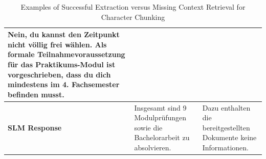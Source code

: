 \documentclass[12pt]{article} %
\begin{document}
\begin{table}[htbp]
\begin{tabularx}{\textwidth}{l X X}
        Nein, du kannst den Zeitpunkt nicht v\"ollig frei w\"ahlen. Als formale Teilnahmevoraussetzung f\"ur das Praktikums-Modul ist vorgeschrieben, dass du dich mindestens im 4. Fachsemester befinden musst.                                                                                                                                                                                                                                                                                                                                                                                                                                    \\
        \midrule
        \textbf{SLM Response}                                                                                                                                                                                                                                                                                                                                                                                                                                                                                                                 &
        Insgesamt sind 9 Modulpr\"ufungen sowie die Bachelorarbeit zu absolvieren.                                                                                                                                                                                                                                                                                                                                                                                                                                                            &
        Dazu enthalten die bereitgestellten Dokumente keine Informationen.                                                                                                                                                                                                                                                                                                                                                                                                                                                                                                                                                                          \\
        \bottomrule
    \end{tabularx}
    \caption{Examples of Successful Extraction versus Missing Context Retrieval for Character Chunking}
    \label{tab:slm_evaluation_comparison_retrieval_character}
\end{table}
\end{document}
